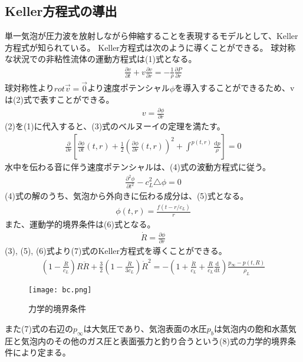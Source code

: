 \documentclass[11pt,a4j]{jreport}
\begin{document}
\subsection{Keller方程式の導出}
単一気泡が圧力波を放射しながら伸縮することを表現するモデルとして、Keller方程式が知られている。
Keller方程式は次のように導くことができる。
球対称な状況での非粘性流体の運動方程式は(1)式となる。
\begin{align}
\frac{\partial v}{\partial t} + v\frac{\partial v}{\partial r} = -\frac{1}{\rho}\frac{\partial P}{\partial r}\tag{1}
\end{align}
%
球対称性より$rot\overrightarrow{v}=\overrightarrow{0}$より速度ポテンシャル$\phi$を導入することができるため、vは(2)式で表すことができる。
\begin{align}
v=\frac{\partial \phi}{\partial r}\tag{2}
\end{align}
%
(2)を(1)に代入すると、(3)式のベルヌーイの定理を満たす。
\begin{align}
\frac{\partial }{\partial r}\left[\frac{\partial \phi}{\partial t}(t, r)+\frac{1}{2}\left(\frac{\partial \phi}{\partial r}(t,r)\right)^2+\int_{}^{p(t,r)}\frac{\text{d}p}{\rho} \right] = 0\tag{3}
\end{align}
%
水中を伝わる音に伴う速度ポテンシャルは、(4)式の波動方程式に従う。
\begin{align}
\frac{\partial^2 \phi}{\partial t^2}-c_{L}^2\triangle\phi=0\tag{4}
\end{align}
%
(4)式の解のうち、気泡から外向きに伝わる成分は、(5)式となる。
\begin{align}
\phi(t,r)=\frac{f(t-r/c_{L})}{r}\tag{5}
\end{align}
%
また、運動学的境界条件は(6)式となる。
\begin{align}
\dot{R}=\frac{\partial \phi}{\partial r}\tag{6}
\end{align}
%
(3), (5), (6)式より(7)式のKeller方程式を導くことができる。
\begin{align}
\left(1-\frac{\dot{R}}{c_{L}}\right)R\ddot{R}+\frac{3}{2}\left(1-\frac{\dot{R}}{3c_{L}}\right)\dot{R}^2 = -\left(1+\frac{\dot{R}}{c_{L}}+\frac{R}{c_{L}}\frac{\text{d}}{\text{dt}}\right)\frac{p_{∞}-p(t, R)}{\rho_{L}}\tag{7}
\end{align}
%
\begin{figure}[tbh]
\centering
\texttt{[image: bc.png]}
\caption{力学的境界条件}
\label{fig:bc}
\end{figure}
%
また(7)式の右辺の$p_{∞}$は大気圧であり、気泡表面の水圧$p_{b}$は気泡内の飽和水蒸気圧と気泡内のその他のガス圧と表面張力と釣り合うという(8)式の力学的境界条件により定まる。
\end{document}
